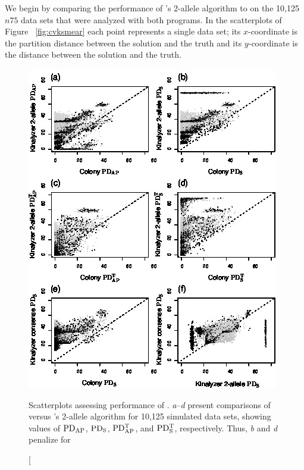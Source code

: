 \documentclass[11pt]{article}
\begin{document}
{We begin by comparing the performance of  \kinalyzer{}'s 2-allele algorithm to \colony{} on the 10,125 
$n75$ data sets that were analyzed with both programs.  In the scatterplots of Figure~
\ref{fig:cvksmear} each point represents a single data set; its $x$-coordinate is the partition 
distance between the \colony{} solution and the truth and its $y$-coordinate is the distance between 
the \kinalyzer{} solution and the truth.


\begin{figure}
\begin{center}
\includegraphics[width=.9\textwidth]{images/various_kin_smear.jpg}  %
\end{center}
\caption[Scatterplots assessing performance of \kinalyzer{}.  {\em a}--{\em d} present comparisons of 
\colony{} versus \kinalyzer{}'s 2-allele algorithm for 10,125 simulated data sets, showing values of $
\mathrm{PD_{AP}}$, $\mathrm{PD_S}$, $\mathrm{PD_{AP}^T}$, and $\mathrm{PD_S^T}$, respectively.  Thus, {\em b} and {\em d} penalize \kinalyzer{} for 

\end{figure}}
\end{document}
